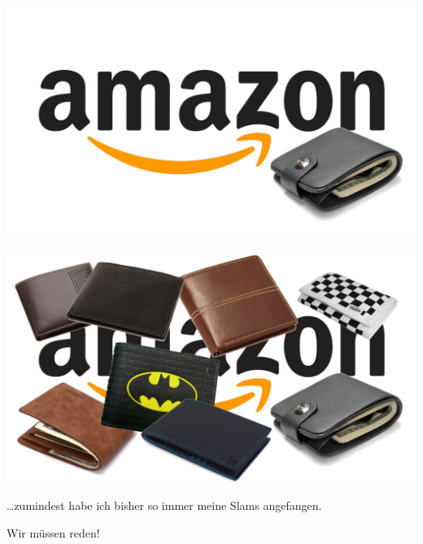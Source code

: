 \documentclass[aspectratio=43]{beamer}
\begin{document}
\begin{frame}
\begin{center}
\includegraphics[width=\textwidth]{images/amazon-one-wallet.jpg} 
\end{center}
\end{frame}

\begin{frame}
\begin{center}
\includegraphics[width=\textwidth]{images/amazon-buncha-wallets.jpg} 
\end{center}
\end{frame}


\begin{frame}

\begin{center}
\dots zumindest habe ich bisher so immer meine Slams angefangen.
\pause\bigskip

Wir müssen reden!
\end{center}

\end{frame}
\end{document}
